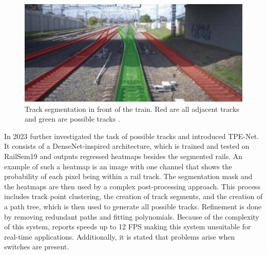 \vspace{1cm}

\begin{figure}[H]
    \centering
    \includegraphics[width=0.5\linewidth]{PICs//semanticSegmentation/possibleTracks.jpg}
    \caption{Track segmentation in front of the train. Red are all adjacent tracks and green are possible tracks \cite{RailraodSemanticPossibleTracks2020}.}
    \label{fig:possibleTracks}
\end{figure}

\vspace{1cm}

In 2023 \cite{TPENet2023} further investigated the task of possible tracks and introduced \ac{TPE-Net}.
It consists of a DenseNet-inspired \cite{DenseNets} architecture, which is trained and tested on RailSem19 and outputs regressed heatmaps besides the segmented rails.
An example of such a heatmap is an image with one channel that shows the probability of each pixel being within a rail track.
The segmentation mask and the heatmaps are then used by a complex post-processing approach.
This process includes track point clustering, the creation of track segments, and the creation of a path tree, which is then used to generate all possible tracks.
Refinement is done by removing redundant paths and fitting polynomials.
Because of the complexity of this system, \cite{TPENet2023} reports speeds up to 12 \ac{FPS} making this system unsuitable for real-time applications.
Additionally, it is stated that problems arise when switches are present.



